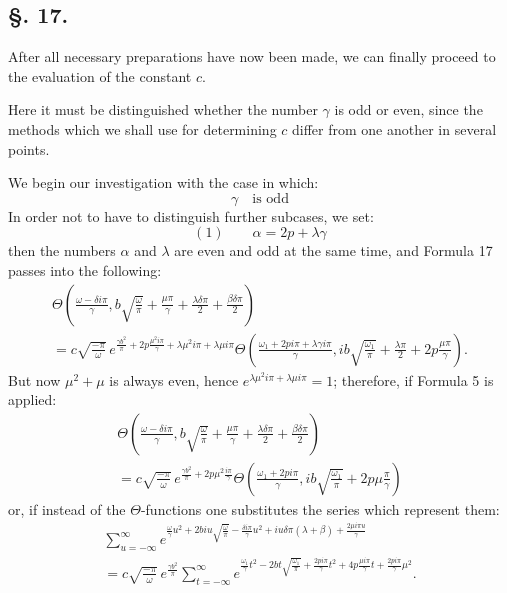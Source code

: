\documentclass[10pt]{article}
\newcommand{\sourceanchor}[1]{\hypertarget{source-#1}{}}
\begin{document}
\sourceanchor{PA13}
\subsection*{\S. 17.}
After all necessary preparations have now been made, we can finally proceed to the evaluation of the constant \(c\).

Here it must be distinguished whether the number \(\gamma\) is odd or even, since the methods which we shall use for determining \(c\) differ from one another in several points.

We begin our investigation with the case in which:
\[
\gamma\quad\text{is odd}
\]
In order not to have to distinguish further subcases, we set:
\[
(1)\qquad \alpha=2p+\lambda\gamma
\]
then the numbers \(\alpha\) and \(\lambda\) are even and odd at the same time, and Formula 17 passes into the following:
\begin{multline*}
\Theta\!\left(\frac{\omega-\delta i\pi}{\gamma},
 b\sqrt{\frac{\omega}{\pi}}+\frac{\mu\pi}{\gamma}+\frac{\lambda\delta\pi}{2}+\frac{\beta\delta\pi}{2}\right)\\
=c\sqrt{\frac{-\pi}{\omega}}\,e^{\frac{\gamma b^{2}}{\pi}+2p\frac{\mu^{2}i\pi}{\gamma}+\lambda\mu^{2}i\pi+\lambda\mu i\pi}
\Theta\!\left(\frac{\omega_{1}+2p i\pi+\lambda\gamma i\pi}{\gamma},
 ib\sqrt{\frac{\omega_{1}}{\pi}}+\frac{\lambda\pi}{2}+2p\frac{\mu\pi}{\gamma}\right).
\end{multline*}
But now \(\mu^{2}+\mu\) is always even, hence
\(e^{\lambda\mu^{2}i\pi+\lambda\mu i\pi}=1\); therefore, if Formula 5 is applied:
\begin{multline*}
\Theta\!\left(\frac{\omega-\delta i\pi}{\gamma},
 b\sqrt{\frac{\omega}{\pi}}+\frac{\mu\pi}{\gamma}+\frac{\lambda\delta\pi}{2}+\frac{\beta\delta\pi}{2}\right)\\
=c\sqrt{\frac{-\pi}{\omega}}\,e^{\frac{\gamma b^{2}}{\pi}+2p\mu^{2}\frac{i\pi}{\gamma}}
\Theta\!\left(\frac{\omega_{1}+2p i\pi}{\gamma},
 ib\sqrt{\frac{\omega_{1}}{\pi}}+2p\mu\frac{\pi}{\gamma}\right)
\end{multline*}
or, if instead of the \(\Theta\)-functions one substitutes the series which represent them:
\begin{multline*}
\sum_{u=-\infty}^{\infty}
 e^{\frac{\omega}{\gamma}u^{2}+2biu\sqrt{\frac{\omega}{\pi}}-\frac{\delta i\pi}{\gamma}u^{2}+iu\delta\pi(\lambda+\beta)+\frac{2\mu i\pi u}{\gamma}}\\
=c\sqrt{\frac{-\pi}{\omega}}\,e^{\frac{\gamma b^{2}}{\pi}}
\sum_{t=-\infty}^{\infty}
 e^{\frac{\omega_{1}}{\gamma}t^{2}-2bt\sqrt{\frac{\omega_{1}}{\pi}}+\frac{2p i\pi}{\gamma}t^{2}+4p\frac{\mu i\pi}{\gamma}t+\frac{2p i\pi}{\gamma}\mu^{2}}.
\end{multline*}
\end{document}

